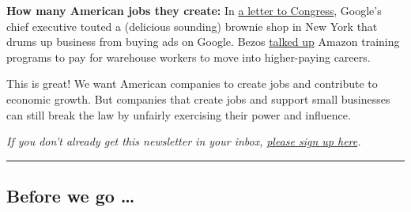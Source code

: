 \textbf{How many American jobs they create:} In
\href{https://docs.house.gov/meetings/JU/JU05/20200729/110883/HHRG-116-JU05-Wstate-PichaiS-20200729.pdf}{a
letter to Congress}, Google's chief executive touted a (delicious
sounding) brownie shop in New York that drums up business from buying
ads on Google. Bezos
\href{https://docs.house.gov/meetings/JU/JU05/20200729/110883/HHRG-116-JU05-Wstate-BezosJ-20200729.pdf}{talked
up} Amazon training programs to pay for warehouse workers to move into
higher-paying careers.

This is great! We want American companies to create jobs and contribute
to economic growth. But companies that create jobs and support small
businesses can still break the law by unfairly exercising their power
and influence.

\emph{If you don't already get this newsletter in your inbox,}
\href{https://www.nytimes.com/newsletters/signup/OT}{\emph{please sign
up here}}\emph{.}

\begin{center}\rule{0.5\linewidth}{\linethickness}\end{center}

\hypertarget{before-we-go-}{%
\subsection{Before we go \ldots{}}\label{before-we-go-}}

